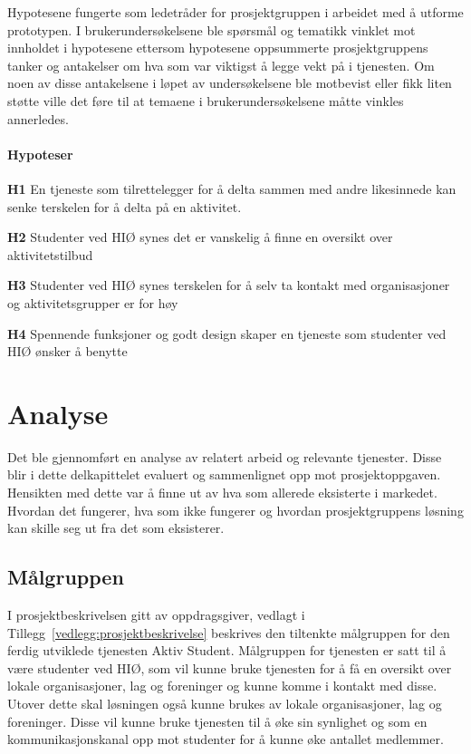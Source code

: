 Hypotesene fungerte som ledetråder for prosjektgruppen i arbeidet med å utforme prototypen. I brukerundersøkelsene ble spørsmål og tematikk vinklet mot innholdet i hypotesene ettersom hypotesene oppsummerte prosjektgruppens tanker og antakelser om hva som var viktigst å legge vekt på i tjenesten. Om noen av disse antakelsene i løpet av undersøkelsene ble motbevist eller fikk liten støtte ville det føre til at temaene i brukerundersøkelsene måtte vinkles annerledes.

\paragraph{Hypoteser}
\begin{compactitem}
\item[{\bf H1}] En tjeneste som tilrettelegger for å delta sammen med andre likesinnede kan senke terskelen for å delta på en aktivitet.
\item[{\bf H2}] Studenter ved HIØ synes det er vanskelig å finne en oversikt over aktivitetstilbud
\item[{\bf H3}] Studenter ved HIØ synes terskelen for å selv ta kontakt med organisasjoner og aktivitetsgrupper er for høy 
\item[{\bf H4}] Spennende funksjoner og godt design skaper en tjeneste som studenter ved HIØ ønsker å benytte
\end{compactitem}



\section{Analyse}
Det ble gjennomført en analyse av relatert arbeid og relevante tjenester. Disse blir i dette delkapittelet evaluert og sammenlignet opp mot prosjektoppgaven. Hensikten med dette var å finne ut av hva som allerede eksisterte i markedet. Hvordan det fungerer, hva som ikke fungerer og hvordan prosjektgruppens løsning kan skille seg ut fra det som eksisterer. 

\subsection{Målgruppen}
I prosjektbeskrivelsen gitt av oppdragsgiver, vedlagt i Tillegg~\ref{vedlegg:prosjektbeskrivelse} beskrives den tiltenkte målgruppen for den ferdig utviklede tjenesten Aktiv Student. Målgruppen for tjenesten er satt til å være studenter ved HIØ, som vil kunne bruke tjenesten for å få en oversikt over lokale organisasjoner, lag og foreninger og kunne komme i kontakt med disse. Utover dette skal løsningen også kunne brukes av lokale organisasjoner, lag og foreninger. Disse vil kunne bruke tjenesten til å øke sin synlighet og som en kommunikasjonskanal opp mot studenter for å kunne øke antallet medlemmer.


